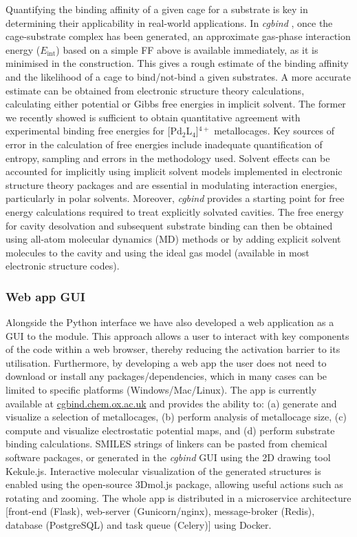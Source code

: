 \documentclass[../../main.tex]{subfiles}
\newcommand{\cgbind}{\emph{cgbind }}
\begin{document}
Quantifying the binding affinity of a given cage for a substrate is key in determining their applicability in real-world applications. In \cgbind, once the cage-substrate complex has been generated, an approximate gas-phase interaction energy ($E_\text{int}$) based on a simple FF above is available immediately, as it is minimised in the construction. This gives a rough estimate of the binding affinity and the likelihood of a cage to bind/not-bind a given substrates. A more accurate estimate can be obtained from electronic structure theory calculations, calculating either potential or Gibbs free energies in implicit solvent. The former we recently showed is sufficient to obtain quantitative agreement with experimental binding free energies for [Pd${}_2$L${}_4$]${}^{4+}$ metallocages.\cite{Young2019} Key sources of error in the calculation of free energies include inadequate quantification of entropy, sampling and errors in the methodology used.\cite{Zhou2009} Solvent effects can be accounted for implicitly using implicit solvent models implemented in electronic structure theory packages and are essential in modulating interaction energies, particularly in polar solvents. Moreover, \cgbind provides a starting point for free energy calculations required to treat explicitly solvated cavities. The free energy for cavity desolvation and subsequent substrate binding can then be obtained using all-atom molecular dynamics (MD) methods or by adding explicit solvent molecules to the cavity and using the ideal gas model (available in most electronic structure codes).


\subsubsection{Web app GUI}
 Alongside the Python interface we have also developed a web application as a GUI to the module. This approach allows a user to interact with key components of the code within a web browser, thereby reducing the activation barrier to its utilisation. Furthermore, by developing a web app the user does not need to download or install any packages/dependencies, which in many cases can be limited to specific platforms (Windows/Mac/Linux). The app is currently available at {\url{cgbind.chem.ox.ac.uk}} and provides the ability to: (a) generate and visualize a selection of metallocages, (b) perform analysis of metallocage size, (c) compute and visualize electrostatic potential maps, and (d) perform substrate binding calculations. SMILES strings of linkers can be pasted from chemical software packages, or generated in the \cgbind GUI using the 2D drawing tool Kekule.js.\cite{Jiang2016} Interactive molecular visualization of the generated structures is enabled using the open-source 3Dmol.js package, allowing useful actions such as rotating and zooming.\cite{Rego2015} The whole app is distributed in a microservice architecture [front-end (Flask), web-server (Gunicorn/nginx), message-broker (Redis), database (PostgreSQL) and task queue (Celery)] using Docker.
\end{document}
